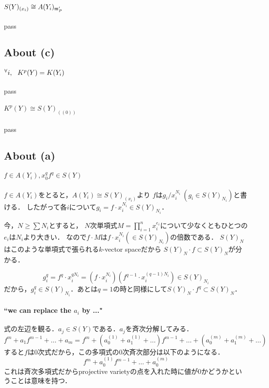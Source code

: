 \documentclass[a4paper]{jarticle}
\begin{document}
    \paragraph{$S(Y)_{(x_i)} \cong A(Y_i)_{\mathfrak{m}'_P}$}
    pass

    \subsection{About (c)}
    \paragraph{${}^{\forall} i,~~ K^p(Y)=K(Y_i)$}
    pass

    \paragraph{$K^p(Y) \cong S(Y)_{((0))}$}
    pass

    \subsection{About (a)}
    \paragraph{$f \in A(Y_i), x_0^q f^q \in S(Y)$}
    $f \in A(Y_i)$をとると，$A(Y_i) \cong S(Y)_{(x_i)}$より
    $f$は$g_i/x_i^{N_i}~(g_i \in S(Y)_{N_i})$と書ける．
    したがって各$i$について$g_i=f \cdot x_i^{N_i} \in S(Y)_{N_i}$．

    今，$N \geq \sum{N_i}$とすると，
    $N$次単項式$M=\prod_{i=1}^{n}{x_i^{e_i}}$について少なくともひとつの$e_i$は$N_i$より大きい．
    なので$f \cdot M$は$f \cdot x_i^{N_i} (\in S(Y)_{N_i})$の倍数である．
    $S(Y)_N$はこのような単項式で張られる$k$-vector spaceだから
    $S(Y)_N \cdot f \subset S(Y)_N$が分かる．

    \[ g_i^q=f^q \cdot x_i^{qN_i}=(f \cdot x_i^{N_i})(f^{q-1} \cdot x_i^{(q-1)N_i}) \in S(Y)_{N_i} \]
    だから，$g_i^q \in S(Y)_{N_i}$．あとは$q=1$の時と同様にして$S(Y)_N \cdot f^q \subset S(Y)_N$．

    \paragraph{``we can replace the $a_i$ by ..."}
    式の左辺を観る．$a_j \in S(Y)$である．$a_j$を斉次分解してみる．
    \[ f^m+a_1 f^{m-1}+\dots+a_m=f^m+(a^{(1)}_0+a^{(1)}_1+\dots) f^{m-1}+\dots+(a^{(m)}_0+a^{(m)}_1+\dots) \]
    すると$f$は0次式だから，この多項式の0次斉次部分は以下のようになる．
    \[ f^m+a^{(1)}_0 f^{m-1}+\dots+a^{(m)}_0 \]
    これは斉次多項式だからprojective varietyの点を入れた時に値が0かどうかということは意味を持つ．
\end{document}
